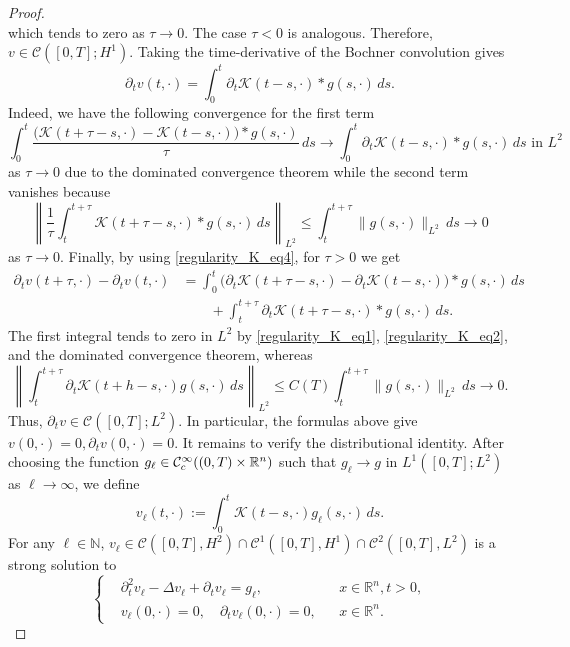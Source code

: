 \documentclass[10pt,a4paper]{amsart}
\newcommand{\ity}{\infty}
\begin{document}
\begin{proof}
\[		\]
		which tends to zero as $\tau \to 0$. The case $\tau<0$ is analogous. Therefore, $v\in \mathcal{C}([0,T];H^1)$. Taking the time-derivative of the Bochner convolution gives
		\begin{equation}\label{regularity_K_eq4}
			\partial_tv(t,\cdot)=\int_0^t\partial_t \mathcal{K}(t-s,\cdot)\ast g(s,\cdot)\,ds.
		\end{equation}
		Indeed, we have the following convergence for the first term 
		\[
		\int_0^t
		\frac{\bigl(\mathcal{K}(t+\tau-s,\cdot)-\mathcal{K}(t-s,\cdot)\bigr)\ast g(s,\cdot)}{\tau}\,ds\to \int_0^t\partial_t \mathcal{K}(t-s,\cdot)\ast g(s,\cdot)\,ds\text{ in }L^2
		\]
		as $\tau\to 0$ due to the dominated convergence theorem while the second term vanishes because
		\[
		\left\|\frac{1}{\tau}\int_t^{t+\tau}\mathcal{K}(t+\tau-s,\cdot)\ast g(s,\cdot)\,ds \right\|_{L^2}\leq \int_t^{t+\tau}\|g(s,\cdot)\|_{L^2}\,ds\to 0
		\]
		as $\tau\to 0$. Finally, by using \eqref{regularity_K_eq4}, for $\tau>0$ we get
		\[
		\begin{aligned}
			\partial_tv(t+\tau,\cdot)-\partial_tv(t,\cdot)&=\int_0^t
			\bigl(\partial_t \mathcal{K}(t+\tau-s,\cdot)-\partial_t\mathcal{K}(t-s,\cdot)\bigr)\ast g(s,\cdot)\,ds\\
			&\qquad +\int_t^{t+\tau}\partial_t \mathcal{K}(t+\tau-s,\cdot)\ast g(s,\cdot)\,ds.
		\end{aligned}
		\]
		The first integral tends to zero in $L^2$ by \eqref{regularity_K_eq1}, \eqref{regularity_K_eq2}, and the dominated convergence theorem, whereas
		\[
		\left\|\int_t^{t+\tau}\partial_t\mathcal{K}(t+h-s,\cdot)g(s,\cdot)\,ds\right\|_{L^2}\leq C(T)\int_t^{t+\tau}\| g(s,\cdot)\|_{L^2}\,ds\to 0.
		\]
		Thus, $\partial_tv\in \mathcal{C}([0,T];L^2)$. In particular, the formulas above give $v(0,\cdot)=0, \partial_tv(0,\cdot)=0$. It remains to verify the distributional identity. After choosing the function $g_\ell\in \mathcal{C}^\infty_{\rm c}((0,T)\times\mathbb R^n)$ such that $g_\ell\to g$ in $L^1([0,T];L^2)$ as $\ell\to\ity$, we define
		\[
		v_\ell(t,\cdot):=\int_0^t\mathcal{K}(t-s,\cdot)g_\ell(s,\cdot)\,ds.
		\]
		For any $\ell\in\mathbb N$, $v_\ell\in \mathcal{C}([0,T],H^2)\cap \mathcal{C}^1([0,T],H^1)\cap \mathcal{C}^2([0,T],L^2)$ is a strong solution to
		\[
		\left\{
		\begin{aligned}
			&\partial_t^2v_\ell-\Delta v_\ell+\partial_tv_\ell=g_\ell,&&x\in \mathbb{R}^n,t>0,\\
			&v_\ell(0,\cdot)=0,\quad \partial_tv_\ell(0,\cdot)=0,&&x\in \mathbb{R}^n.
		\end{aligned}
\]
\end{proof}
\end{document}
